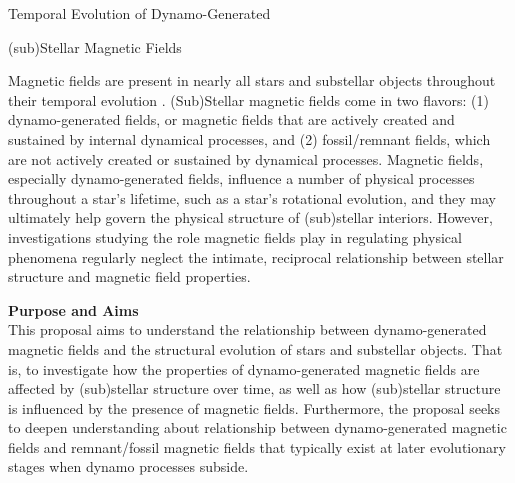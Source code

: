 \documentclass[12pt,a4paper]{article}
\begin{document}
\begin{center}
	{\bf {\Large Temporal Evolution of Dynamo-Generated 
	
	 (sub)Stellar Magnetic Fields}} 
\end{center}

Magnetic fields are present in nearly all stars and substellar objects throughout their temporal evolution \citep[hereafter (sub)stellar evolution;][]{Donati2009}. (Sub)Stellar magnetic fields come in two flavors: (1) dynamo-generated fields, or magnetic fields that are actively created and sustained by internal dynamical processes, and (2) fossil/remnant fields, which are not actively created or sustained by dynamical processes. Magnetic fields, especially dynamo-generated fields, influence a number of physical processes throughout a star's lifetime, such as a star's rotational evolution, and they may ultimately help govern the physical structure of (sub)stellar interiors. However, investigations studying the role magnetic fields play in regulating physical phenomena regularly neglect the intimate, reciprocal relationship between stellar structure and magnetic field properties. 


\vspace{0.5\baselineskip}

{\bf \large Purpose and Aims} \\
This proposal aims to understand the relationship between dynamo-generated magnetic fields and the structural evolution of stars and substellar objects. That is, to investigate how the properties of dynamo-generated magnetic fields are affected by (sub)stellar structure over time, as well as how (sub)stellar structure is influenced by the presence of magnetic fields. Furthermore, the proposal seeks to deepen understanding about relationship between dynamo-generated magnetic fields and remnant/fossil magnetic fields that typically exist at later evolutionary stages when dynamo processes subside.
\end{document}
